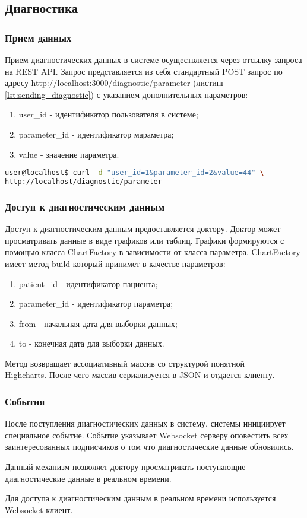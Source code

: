 \subsection{Диагностика}
\subsubsection{Прием данных}
Прием диагностических данных в системе осуществляется через отсылку запроса на
REST API. Запрос представляется из себя стандартный POST запрос по адресу
\url{http://localhost:3000/diagnostic/parameter} (листинг
\ref{lst:sending_diagnostic}) с указанием дополнительных параметров:
\begin{enumerate}
  \item user\_id - идентификатор пользователя в системе;
  \item parameter\_id - идентификатор мараметра;
  \item value - значение параметра.   
\end{enumerate}

\begin{lstlisting}[language=Bash,caption=Отправка диагностических данных
,label={lst:sending_diagnostic}] 
user@localhost$ curl -d "user_id=1&parameter_id=2&value=44" \
http://localhost/diagnostic/parameter
\end{lstlisting}

\subsubsection{Доступ к диагностическим данным}
Доступ к диагностическим данным предоставляется доктору. Доктор может
просматривать данные в виде графиков или таблиц. Графики формируются с помощью
класса ChartFactory в зависимости от класса параметра. ChartFactory имеет метод
build который принимет в качестве параметров:
\begin{enumerate}
  \item patient\_id - идентификатор пациента;
  \item parameter\_id - идентификатор параметра;
  \item from - начальная дата для выборки данных;
  \item to - конечная дата для выборки данных.
\end{enumerate}

Метод возвращает ассоциативный массив со структурой понятной \\ Highcharts.
После чего массив сериализуется в JSON и отдается клиенту.

\subsubsection{События}
После поступления диагностических данных в систему, системы инициирует
специальное событие. Событие указывает Websocket серверу оповестить всех
заинтересованных подписчиков о том что диагностические данные обновились.

Данный механизм позволяет доктору просматривать поступающие диагностические
данные в реальном времени.

Для доступа к диагностическим данным в реальном времени используется Websocket
клиент.
